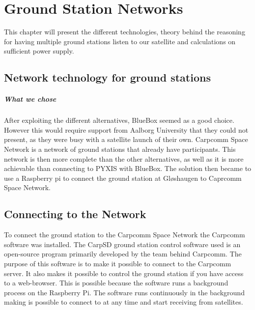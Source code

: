 \chapter{Ground Station Networks}

This chapter will present the different technologies, theory behind the reasoning for having multiple ground stations listen to our satellite and calculations on sufficient power supply. 






\section{Network technology for ground stations}





\paragraph{What we chose}
After exploiting the different alternatives, BlueBox seemed as a good choice. However this would require support from Aalborg University that they could not present, as they were busy with a satellite launch of their own. Carpcomm Space Network is a network of ground stations that already have participants. This network is then more complete than the other alternatives, as well as it is more achievable than connecting to PYXIS with BlueBox. The solution then became to use a Raspberry pi to connect the ground station at Gløshaugen to Caprcomm Space Network.
 


\section {Connecting to the Network}

To connect the ground station to the Carpcomm Space Network the Carpcomm software was installed. The CarpSD ground station control software used is an open-source program primarily developed by the team behind Carpcomm. The purpose of this software is to make it possible to connect to the Carpcomm server. It also makes it possible to control the ground station if you have access to a web-browser. This is possible because the software runs a background process on the Raspberry Pi. The software runs continuously in the background making is possible to connect to at any time and start receiving from satellites.

